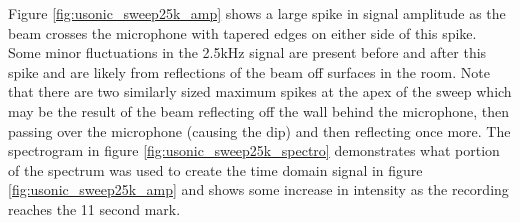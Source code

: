 Figure \ref{fig:usonic_sweep25k_amp} shows a large spike in signal amplitude as the beam crosses the microphone with tapered edges on either side of this spike. Some minor fluctuations in the 2.5kHz signal are present before and after this spike and are likely from reflections of the beam off surfaces in the room. Note that there are two similarly sized maximum spikes at the apex of the sweep which may be the result of the beam reflecting off the wall behind the microphone, then passing over the microphone (causing the dip) and then reflecting once more. The spectrogram in figure \ref{fig:usonic_sweep25k_spectro} demonstrates what portion of the spectrum was used to create the time domain signal in figure \ref{fig:usonic_sweep25k_amp} and shows some increase in intensity as the recording reaches the 11 second mark.


